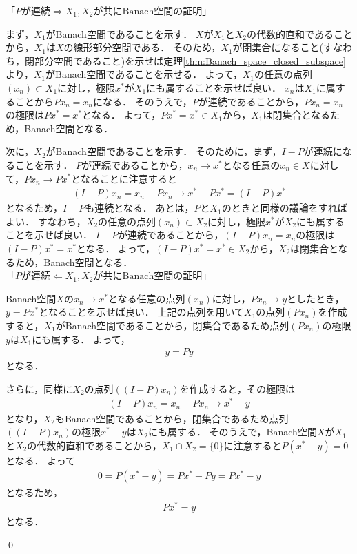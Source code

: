 \begin{Proof}
\noindent 「$P\mbox{が連続} \Rightarrow X_1, X_2\mbox{が共にBanach空間}$の証明」

まず，$X_1$がBanach空間であることを示す．
$X$が$X_1$と$X_2$の代数的直和であることから，$X_1$は$X$の線形部分空間である．
そのため，$X_1$が閉集合になること(すなわち，閉部分空間であること)を示せば定理\ref{thm:Banach_space_closed_subspace}より，$X_1$がBanach空間であることを示せる．
よって，$X_1$の任意の点列$(x_n) \subset X_1$に対し，極限$x^*$が$X_1$にも属することを示せば良い．
$x_n$は$X_1$に属することから$P x_n = x_n$になる．
そのうえで，$P$が連続であることから，$P x_n = x_n$の極限は$P x^* = x^*$となる．
よって，$P x^* = x^* \in X_1$から，$X_1$は閉集合となるため，Banach空間となる．

次に，$X_2$がBanach空間であることを示す．
そのために，まず，$I-P$が連続になることを示す．
$P$が連続であることから，$x_n \rightarrow x^*$となる任意の$x_n \in X$に対して，$P x_n \rightarrow P x^*$となることに注意すると
\begin{align*}
	(I - P) x_n = x_n - P x_n \rightarrow x^* - P x^* = (I - P) x^*
\end{align*}
となるため，$I - P$も連続となる．
あとは，$P$と$X_1$のときと同様の議論をすればよい．
すなわち，$X_2$の任意の点列$(x_n) \subset X_2$に対し，極限$x^*$が$X_2$にも属することを示せば良い．
$I - P$が連続であることから，$(I - P)x_n = x_n $の極限は$(I - P)x^* = x^* $となる．
よって，$(I - P) x^* = x^* \in X_2$から，$X_2$は閉集合となるため，Banach空間となる．
\\

\noindent 「$P\mbox{が連続} \Leftarrow X_1, X_2\mbox{が共にBanach空間}$の証明」

Banach空間$X$の$x_n \rightarrow x^*$となる任意の点列$(x_n)$に対し，$P x_n \rightarrow y$としたとき，$y = P x^*$となることを示せば良い．
上記の点列を用いて$X_1$の点列$( P x_n )$を作成すると，$X_1$がBanach空間であることから，閉集合であるため点列$( P x_n )$の極限$y$は$X_1$にも属する．
よって，
\begin{align*}
	y = Py
\end{align*}
となる．

さらに，同様に$X_2$の点列$( (I - P)x_n )$を作成すると，その極限は
\begin{align*}
	(I - P)x_n = x_n - P x_n \rightarrow x^* - y
\end{align*}
となり，$X_2$もBanach空間であることから，閉集合であるため点列$((I-P)x_n)$の極限$x^* - y$は$X_2$にも属する．
そのうえで，Banach空間$X$が$X_1$と$X_2$の代数的直和であることから，$X_1 \cap X_2 = \{ 0 \}$に注意すると$P(x^* - y) = 0$となる．
よって
\begin{align*}
	0 = P(x^* - y) = P x^* - P y = P x^* - y
\end{align*}
となるため，
\begin{align*}
	P x^* = y
\end{align*}
となる．


\qed
\end{Proof}

